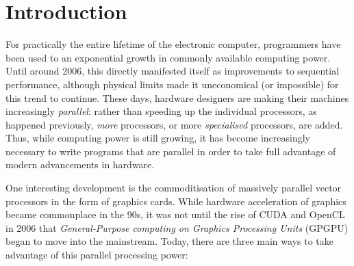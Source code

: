 \chapter{Introduction}

For practically the entire lifetime of the electronic computer,
programmers have been used to an exponential growth in commonly
available computing power.  Until around 2006, this directly
manifested itself as improvements to sequential performance, although
physical limits made it uneconomical (or impossible) for this trend to
continue.  These days, hardware designers are making their machines
increasingly \textit{parallel}: rather than speeding up the individual
processors, as happened previously, \textit{more} processors, or more
\textit{specialised} processors, are added.  Thus, while computing
power is still growing, it has become increasingly necessary to write
programs that are parallel in order to take full advantage of modern
advancements in hardware.

One interesting development is the commoditisation of massively
parallel vector processors in the form of graphics cards.  While
hardware acceleration of graphics became commonplace in the 90s, it
was not until the rise of CUDA and OpenCL in 2006 that
\textit{General-Purpose computing on Graphics Processing Units}
(GPGPU) began to move into the mainstream.  Today, there are three
main ways to take advantage of this parallel processing power:

